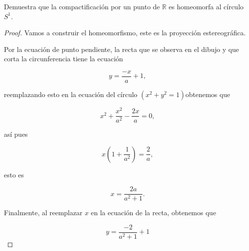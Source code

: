 
\item Demuestra que la compactificación por un punto de $\mathbb{R}$ es homeomorfa al círculo $S^1$.\\

\begin{proof}
    Vamos a construir el homeomorfismo, este es la proyección estereográfica.

\begin{center}
    
\end{center}

Por la ecuación de punto pendiente, la recta que se observa en el dibujo y que corta la circunferencia  tiene la ecuación 

$$y=\frac{-x}{a}+1,$$

reemplazando esto en la ecuación del círculo $(x^2+y^2=1)$obtenemos que 

$$x^2+\frac{x^2}{a^2}-\frac{2x}{a}=0,$$

así pues

$$x\left(1+\frac{1}{a^2}\right)=\frac{2}{a},$$

esto es 

$$x=\frac{2a}{a^2+1}.$$

Finalmente, al reemplazar $x$ en la ecuación de la recta, obtenemos que 

$$y=\frac{-2}{a^2+1}+1$$

\end{proof}